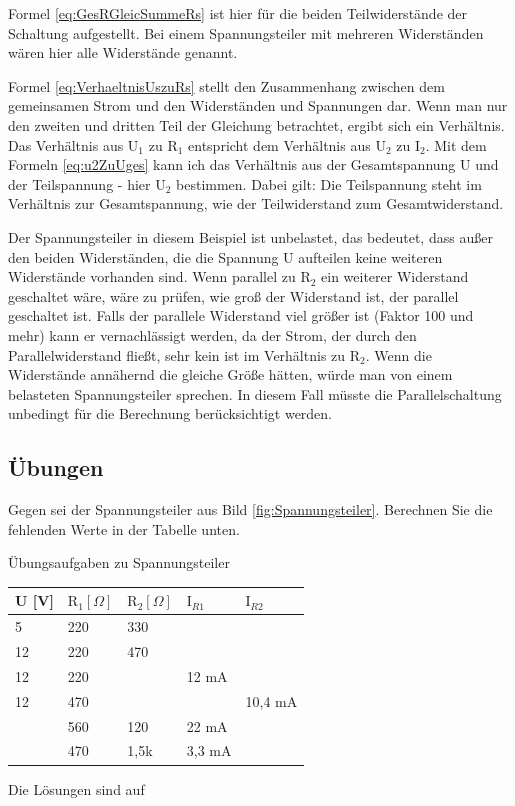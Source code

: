 Formel \ref{eq:GesRGleicSummeRs} ist hier für die beiden Teilwiderstände der Schaltung aufgestellt. Bei einem Spannungsteiler mit mehreren Widerständen wären hier alle Widerstände genannt.

Formel \ref{eq:VerhaeltnisUszuRs} stellt den Zusammenhang zwischen dem gemeinsamen Strom und den Widerständen und Spannungen dar. Wenn man nur den zweiten und dritten Teil der Gleichung betrachtet, ergibt sich ein Verhältnis. Das Verhältnis aus $\text{U}_1$ zu $\text{R}_1$ entspricht dem Verhältnis aus $\text{U}_2$ zu $\text{I}_2$. Mit dem Formeln \ref{eq:u2ZuUges} kann ich das Verhältnis aus der Gesamtspannung U und der Teilspannung - hier $\text{U}_2$ bestimmen. Dabei gilt: Die Teilspannung steht im Verhältnis zur Gesamtspannung, wie der Teilwiderstand zum Gesamtwiderstand.

Der Spannungsteiler in diesem Beispiel ist unbelastet, das bedeutet, dass außer den beiden Widerständen, die die Spannung U aufteilen keine weiteren Widerstände vorhanden sind. Wenn parallel zu $\text{R}_2$ ein weiterer Widerstand geschaltet wäre, wäre zu prüfen, wie groß der Widerstand ist, der parallel geschaltet ist. Falls der parallele Widerstand viel größer ist (Faktor 100 und mehr) kann er vernachlässigt werden, da der Strom, der durch den Parallelwiderstand fließt, sehr kein ist im Verhältnis zu $\text{R}_2$. Wenn die Widerstände annähernd die gleiche Größe hätten, würde man von einem belasteten Spannungsteiler sprechen. In diesem Fall müsste die Parallelschaltung unbedingt für die Berechnung berücksichtigt werden.

\subsection{Übungen}
\label{Aufg:Spannungsteiler}
Gegen sei der Spannungsteiler aus Bild \ref{fig:Spannungsteiler}. Berechnen Sie die fehlenden Werte in der Tabelle unten.\\

\begin{frame}{Übungsaufgaben zu Spannungsteiler}
  \begin{tabular}{l|ll|ll}
    U [V] & $\text{R}_1 [\Omega]$& $\text{R}_2 [\Omega]$& $\text{I}_{R1}$ & $\text{I}_{R2}$\\ \hline
    5  & 220 & 330 &       & \\
    12 & 220 & 470 &       & \\
    12 & 220 &     & 12 mA & \\
    12 & 470 &     &       & 10,4 mA  \\
    & 560 & 120 & 22 mA &   \\
    & 470 & 1,5k &  3,3 mA &   \\
  \end{tabular}
\end{frame}
Die Lösungen sind auf \pageref{Lsg:Spannungsteiler}




